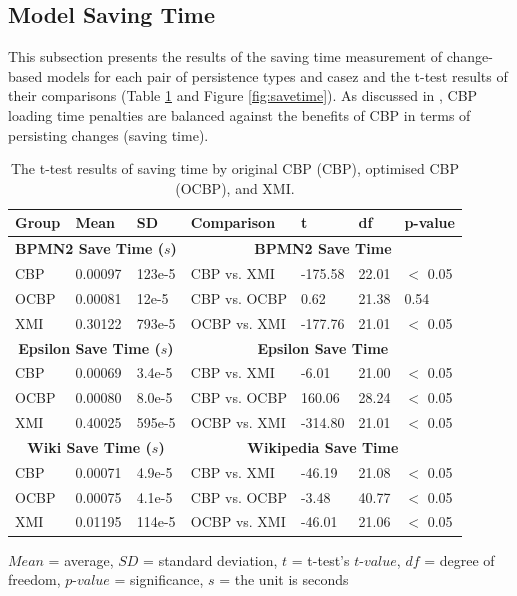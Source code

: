   \subsection{Model Saving Time}
  \label{subsec:saving_time_test}
  This subsection presents the results of the saving time measurement of change-based models for each pair of persistence types and casez and the t-test results of their comparisons (Table \ref{table:ttest_results_savetime} and Figure \ref{fig:savetime}). As discussed in \cite{DBLP:conf/models/YohannisKP17}, CBP loading time penalties are balanced against the benefits of CBP in terms of persisting changes (saving time).
  
  \begin{table}[ht]
    \footnotesize
    \centering
    \caption{The t-test results of saving time by original CBP (CBP), optimised CBP (OCBP), and XMI.}
    \label{table:ttest_results_savetime}
    \begin{tabular}
      {|p{}p{}p{}|p{}p{}p{}p{}|}
      \hline
      
      Group & Mean & SD & Comparison & t & df & p-value \\
      \hline
      \multicolumn{3}{|c|}{\textbf{BPMN2 Save Time ($s$)}} & \multicolumn{4}{c|}{\textbf{BPMN2 Save Time}}\\
      CBP & 0.00097 & 123e-5 & CBP vs. XMI & -175.58 & 22.01 & $<$ 0.05 \\
      OCBP & 0.00081 & 12e-5 & CBP vs. OCBP & 0.62 & 21.38 & 0.54 \\
      XMI & 0.30122 & 793e-5 & OCBP vs. XMI & -177.76 & 21.01 & $<$ 0.05 \\
      \hline
      
      \multicolumn{3}{|c|}{\textbf{Epsilon Save Time ($s$)}} & \multicolumn{4}{c|}{\textbf{Epsilon Save Time}}\\
      CBP & 0.00069 & 3.4e-5 & CBP vs. XMI & -6.01 &21.00 & $<$ 0.05 \\
      OCBP & 0.00080 & 8.0e-5 & CBP vs. OCBP & 160.06 & 28.24 & $<$ 0.05 \\
      XMI & 0.40025 & 595e-5 & OCBP vs. XMI & -314.80 & 21.01 & $<$ 0.05 \\
      \hline
      
      \multicolumn{3}{|c|}{\textbf{Wiki Save Time ($s$)}} & \multicolumn{4}{c|}{\textbf{Wikipedia Save Time}}\\
      CBP & 0.00071 & 4.9e-5 & CBP vs. XMI & -46.19 & 21.08 & $<$ 0.05 \\
      OCBP &0.00075 & 4.1e-5 & CBP vs. OCBP & -3.48 & 40.77 & $<$ 0.05 \\
      XMI & 0.01195 & 114e-5 & OCBP vs. XMI & -46.01 & 21.06 & $<$ 0.05 \\
      \hline
    \end{tabular}
    \justify
    $Mean$ = average, $SD$ = standard deviation, $t$ = t-test’s $t$-$value$, $df$ = degree of freedom, $p$-$value$ = significance, $s$ = the unit is seconds
  \end{table}
    
